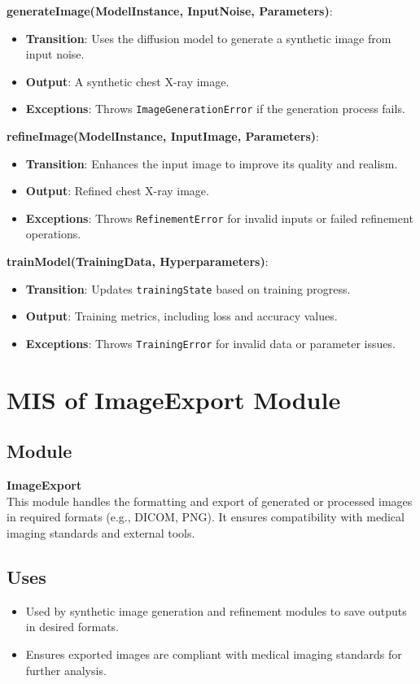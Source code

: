 \documentclass[12pt, titlepage]{article}
\begin{document}
\textbf{generateImage(ModelInstance, InputNoise, Parameters)}:
\begin{itemize}
    \item \textbf{Transition}: Uses the diffusion model to generate a synthetic image from input noise.
    \item \textbf{Output}: A synthetic chest X-ray image.
    \item \textbf{Exceptions}: Throws \texttt{ImageGenerationError} if the generation process fails.
\end{itemize}

\textbf{refineImage(ModelInstance, InputImage, Parameters)}:
\begin{itemize}
    \item \textbf{Transition}: Enhances the input image to improve its quality and realism.
    \item \textbf{Output}: Refined chest X-ray image.
    \item \textbf{Exceptions}: Throws \texttt{RefinementError} for invalid inputs or failed refinement operations.
\end{itemize}

\textbf{trainModel(TrainingData, Hyperparameters)}:
\begin{itemize}
    \item \textbf{Transition}: Updates \texttt{trainingState} based on training progress.
    \item \textbf{Output}: Training metrics, including loss and accuracy values.
    \item \textbf{Exceptions}: Throws \texttt{TrainingError} for invalid data or parameter issues.
\end{itemize}

\newpage
\section{MIS of ImageExport Module}

\subsection{Module}
\textbf{ImageExport} \\
This module handles the formatting and export of generated or processed images in required formats (e.g., DICOM, PNG). It ensures compatibility with medical imaging standards and external tools.

\subsection{Uses}
\begin{itemize}
    \item Used by synthetic image generation and refinement modules to save outputs in desired formats.
    \item Ensures exported images are compliant with medical imaging standards for further analysis.
\end{itemize}
\end{document}

